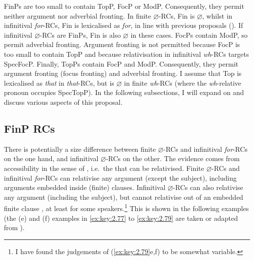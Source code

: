 \documentclass[output=paper]{langsci/langscibook}
\begin{document}
FinPs are too small to contain TopP, FocP or ModP\@. Consequently, they permit
neither argument nor adverbial fronting. In finite $\varnothing${-RCs, Fin is}
$\varnothing$, whilst in infinitival \emph{for}-RCs, Fin is lexicalised as
\emph{for}, in line with previous proposals
(\citealt{Haegeman2012,Radford2009a,Rizzi1997}). If infinitival $\varnothing${-RCs
are FinP}s, Fin is also $\varnothing$ in these cases. FocPs contain ModP, so
permit adverbial fronting. Argument
fronting is not permitted because FocP is too small
to contain TopP and because relativisation in infinitival \emph{wh}{-RCs targets SpecFocP\@. Finally, TopPs
contain FocP and ModP\@. Consequently, they permit argument fronting (focus
fronting) and adverbial fronting.} I assume that Top is lexicalised as
\emph{that} in \emph{that}{-RCs, but is} $\varnothing$ in finite
\emph{wh}{-\glspl{RC} (where the} \emph{wh}{-relative pronoun occupies
SpecTopP).} In the following subsections, I will expand on and discuss various
aspects of this proposal.

\subsection{FinP RCs}

There is potentially a size difference between finite $\varnothing$-\glspl{RC}
and infinitival \emph{for}-\glspl{RC} on the one hand, and infinitival
$\varnothing$-\glspl{RC} on the other. The evidence comes from accessibility in
the sense of \textcite{KeenanComrie1977}, i.e.\ the  that
can be relativised. Finite $\varnothing$-\glspl{RC} and infinitival
\emph{for}-\glspl{RC} can relativise any argument (except the subject),
including arguments embedded inside (finite) clauses. Infinitival
$\varnothing$-\glspl{RC} can also relativise any argument (including the
subject), but cannot relativise out of an embedded finite clause
\citep{Longenbaugh2016}, at least for some speakers.\footnote{I have found the
judgements of (\ref{ex:key:2.79}e,f) to be somewhat variable.} This is shown in the following
examples (the (e) and (f) examples in \eqref{ex:key:2.77} to
\eqref{ex:key:2.79} are taken or adapted from
\citealt{Longenbaugh2016}).\largerpage
\end{document}
